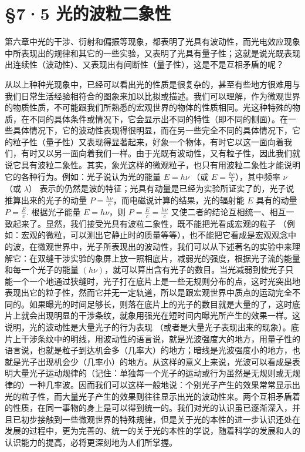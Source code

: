 \section{§7·5
光的波粒二象性}

第六章中光的干涉、衍射和偏振等现象，都表明了光具有波动性，而光电效应现象中所表现出的规律和其它的一些实验，又表明了光具有量子性；这就是说光既表现出连续性（波动性）、又表现出有间断性（量子性），这是不是互相矛盾的呢？

从以上种种光现象中，已经可以看出光的性质是很复杂的，甚至有些地方很难用与我们日常生活经验相符合的图象来加以比拟或描述。我们可以理解，作为微观世界的物质性质，不可能跟我们所熟悉的宏观世界的物体的性质相同。光这种特殊的物质，在不同的具体条件或情况下，它会显示出不同的特性（即不同的侧面）。在一些具体情况下，它的波动性表现得很明显，而在另一些完全不同的具体情况下，它的粒子性（量子性）又表现得显著起来，好象一个物体，有时它以这一面向着我们，有时又以另一面向着我们一样。由于光既有波动性，又有粒子性，因此我们就说它具有波粒二象性。其实，象光这样的微观粒子，也只有用波粒二象性才能说明它的各种行为。例如：光子说认为光的能量
\(E = h\nu\) （或 \(E = \frac{hc}{\lambda}\)），其中频率 \(\nu\) （或
\(\lambda\)）
表示的仍然是波的特征；光具有动量是已经为实验所证实了的，光子说推算出来的光子的动量
\(P = \frac{h\nu}{c}\)，而电磁说计算的结果，光的辐射能 \(E\) 具有的动量
\(P = \frac{E}{c}\). 根据光子能量 \(E = h\nu\)，则
\(P = \frac{E}{c} = \frac{h\nu}{c}\)
又使二者的结论互相统一、相互一致起来了。显然，我们接受光具有波粒二象性，既不能把光看成宏观的粒子
（例如：宏观的微粒，可以测出它静止时的质量等等），也不能把它看成是宏观观念中的波，在微观世界中，光子所表现出的波动性，我们可以从下述著名的实验中来理解它：在双缝干涉实验的象屏上放一照相底片，减弱光的强度，根据光子流的能量和每一个光子的能量
\((h\nu)\)，就可以算出含有光子的数目。当光减弱到使光子只能一个一个地通过狭缝时，光子打在底片上是一些无规则分布的点，这时光突出地表现出它的粒子性，然而它并无一定轨道，所以是跟宏观世界中质点的运动完全不同的。如果曝光的时间足够长，则落在底片上的光子的数目就是大量的了，这时底片上就会出现明显的干涉条纹，就象用强光在短时间内曝光所产生的效果一样。这说明，光的波动性是大量光子的行为表现
（或者是大量光子表现出来的现象）。底片上干涉条纹中的明线，用波动性的语言说，就是光波强度大的地方，用量子性的语言说，也就是粒子到达机会多（几率大）的地方；暗线是光波强度小的地方，也就是光子出现机会少（几率小）的地方。从这样的意义上来说，光波可以看成是表明大量光子运动规律的（记住：单独每一个光子的运动或行为虽然是无规则或无规律的）一种几率波。因而我们可以这样一般地说：个别光子产生的效果常常显示出光的粒子性，而大量光子产生的效果则往往显示出光的波动性来。两个互相矛盾着的性质，在同一事物的身上是可以得到统一的。我们对光的认识虽已逐渐深入，并且已初步接触到一些微观世界的特殊规律，但是关于光的本性的进一步认识还处在发展的过程中，更为完善的、统一的关于光的本性的学说，随着科学的发展和人的认识能力的提高，必将更深刻地为人们所掌握。

